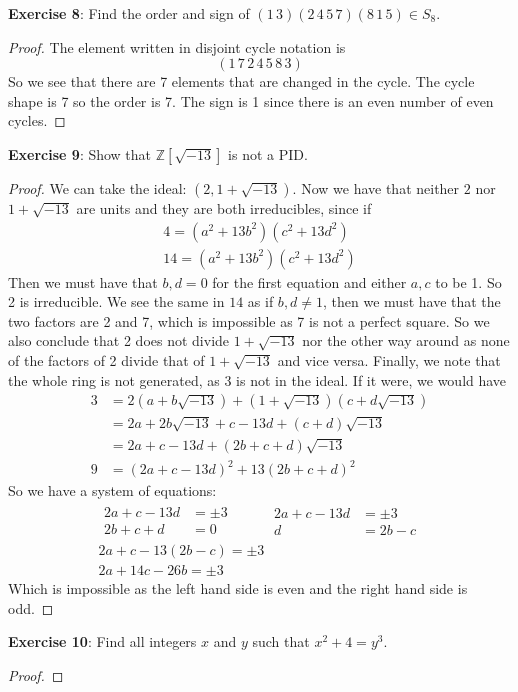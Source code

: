 \documentclass{article}
\begin{document}
\textbf{Exercise 8}: Find the order and sign of $(1 \, 3)(2 \, 4 \, 5 \, 7)(8 \, 1 \, 5) \in S_{8}$.
\begin{proof}
	The element written in disjoint cycle notation is 
	\begin{equation*}
		(1 \, 7 \, 2 \, 4 \, 5 \, 8 \, 3)
	\end{equation*}
	So we see that there are 7 elements that are changed in the cycle. The cycle shape is 7 so the order is 7. The sign is 1 since there is an even number of even cycles.
\end{proof}

\textbf{Exercise 9}: Show that $\mathbb{Z}[\sqrt{-13}]$ is not a PID. 
\begin{proof}
	We can take the ideal: $(2, 1 + \sqrt{-13})$. Now we have that neither $2$ nor $1 + \sqrt{-13}$ are units and they are both irreducibles, since if 
	\begin{align*}
		4 = (a^{2} + 13b^{2})(c^{2} + 13d^{2}) \\
		14 = (a^{2} + 13b^{2})(c^{2} + 13d^{2}) 
	\end{align*}
	Then we must have that $b, d = 0$ for the first equation and either $a, c$ to be 1. So 2 is irreducible. We see the same in $14$ as if $b, d \neq 1$, then we must have that the two factors are 2 and 7, which is impossible as 7 is not a perfect square. So we also conclude that 2 does not divide $1 + \sqrt{-13}$ nor the other way around as none of the factors of 2 divide that of $1 + \sqrt{-13}$ and vice versa. Finally, we note that the whole ring is not generated, as $3$ is not in the ideal. If it were, we would have
	\begin{align*}
		3 &= 2(a + b\sqrt{-13}) + (1 + \sqrt{-13})(c + d\sqrt{-13}) \\
		  &= 2a + 2b\sqrt{-13} + c - 13d + (c + d)\sqrt{-13} \\
		  &= 2a + c - 13d + (2b + c + d)\sqrt{-13} \\
		9 &= (2a + c - 13d)^{2} + 13(2b + c + d)^{2}  
	\end{align*}
	So we have a system of equations:
	\begin{gather*}
		\begin{split}
			2a + c - 13d &= \pm 3 \\
			2b + c + d &= 0 
		\end{split}
		\hspace{30pt} 
		\begin{split}
			2a + c - 13d &= \pm 3 \\
			d &= 2b - c
		\end{split}\\
		2a + c - 13(2b - c) = \pm 3 \\
		2a + 14c - 26b = \pm 3 
	\end{gather*}
	Which is impossible as the left hand side is even and the right hand side is odd.
\end{proof}

\textbf{Exercise 10}: Find all integers $x$ and $y$ such that $x^{2} + 4 = y^{3}$. 
\begin{proof}
	
\end{proof}
\end{document}
